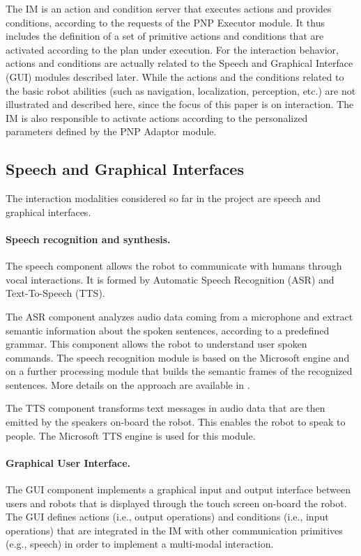 The IM is an action and condition server that executes actions and provides conditions, according to the requests of the PNP Executor module. It thus includes the definition of a set of primitive actions and conditions that are activated according to the plan under execution.
For the interaction behavior, actions and conditions are actually related to the Speech and Graphical Interface (GUI) modules described later. While the actions and the conditions related to the basic robot abilities (such as navigation, localization, perception, etc.) are not illustrated and described here, since the focus of this paper is on interaction.
The IM is also responsible to activate actions according to the personalized parameters defined by the PNP Adaptor module.

\subsection{Speech and Graphical Interfaces}

The interaction modalities considered so far in the project are speech and graphical interfaces.

\paragraph{Speech recognition and synthesis.}
The speech component allows the robot to communicate with humans through vocal interactions. 
It is formed by Automatic Speech Recognition (ASR) and Text-To-Speech (TTS).

The ASR component analyzes audio data coming from a microphone and extract semantic information about the spoken sentences, according to a predefined grammar. This component allows the robot to understand user spoken commands.
The speech recognition module is based on the Microsoft engine and on a further processing module that builds the semantic frames of the recognized sentences.
More details on the approach are available in \cite{Ba...}.

The TTS component transforms text messages in audio data that are then emitted by the speakers on-board the robot. This enables the robot to speak to people. The Microsoft TTS engine is used for this module.


\paragraph{Graphical User Interface.}

The GUI component implements a graphical input and output interface between users and robots that is displayed through the touch screen on-board the robot. The GUI defines actions (i.e., output operations) and conditions (i.e., input operations) that are integrated in the IM with other communication primitives (e.g., speech) in order to implement a multi-modal interaction.

